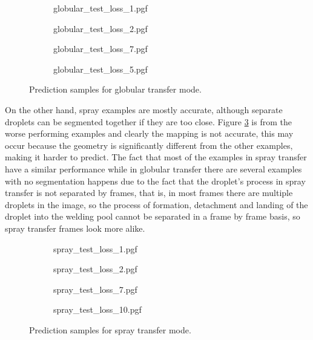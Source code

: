 \begin{figure}
  \begin{subfigure}[b]{0.45\textwidth}
    {globular_test_loss_1.pgf}
    \caption{}
    \label{fig:globular_loss_samples_a}
  \end{subfigure}
\hfill
  \begin{subfigure}[b]{0.45\textwidth}
    {globular_test_loss_2.pgf}
    \caption{}
  \end{subfigure}
 \vfill
  \begin{subfigure}[b]{0.45\textwidth}
    {globular_test_loss_7.pgf}
    \caption{}
  \end{subfigure}
\hfill
  \begin{subfigure}[b]{0.45\textwidth}
    {globular_test_loss_5.pgf}
    \caption{}
  \end{subfigure}
  \caption[Prediction samples for globular transfer mode]{Prediction samples for globular transfer mode.}
  \label{fig:globular_loss_samples}
\end{figure}

 On the other hand, spray examples are mostly accurate, although separate droplets can be segmented together if they are too close. Figure \ref{fig:spray_loss_samples_d} is from the worse performing examples and clearly the mapping is not accurate, this may occur because the geometry is significantly different from the other examples, making it harder to predict. The fact that most of the examples in spray transfer have a similar performance while in globular transfer there are several examples with no segmentation happens due to the fact that the droplet's process in spray transfer is not separated by frames, that is, in most frames there are multiple droplets in the image, so the process of formation, detachment and landing of the droplet into the welding pool cannot be separated in a frame by frame basis, so spray transfer frames look more alike.

\begin{figure}
  \begin{subfigure}[b]{0.45\textwidth}
    {spray_test_loss_1.pgf}
    \caption{}
  \end{subfigure}
\hfill
  \begin{subfigure}[b]{0.45\textwidth}
    {spray_test_loss_2.pgf}
    \caption{}
  \end{subfigure}
 \vfill
  \begin{subfigure}[b]{0.45\textwidth}
    {spray_test_loss_7.pgf}
    \caption{}
  \end{subfigure}
\hfill
  \begin{subfigure}[b]{0.45\textwidth}
    {spray_test_loss_10.pgf}
    \caption{}
    \label{fig:spray_loss_samples_d}
  \end{subfigure}
  \caption[Prediction samples for spray transfer mode]{Prediction samples for spray transfer mode.}
  \label{fig:spray_loss_samples}
\end{figure}

